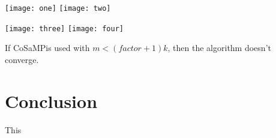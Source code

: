\documentclass[12pt]{article}
\theoremstyle{definition}
\def\cosamp{CoSaMP\hspace{0.1in}}
\begin{document}
\noindent\null\hfill\texttt{[image: one]} \hfill
\texttt{[image: two]} \hfill\null

\noindent\null\hfill\texttt{[image: three]} \hfill
\texttt{[image: four]} \hfill\null
\par If \cosamp is used with $m < (factor+1) k$, then the algorithm doesn't converge.

\section{Conclusion}
This



\end{document}
